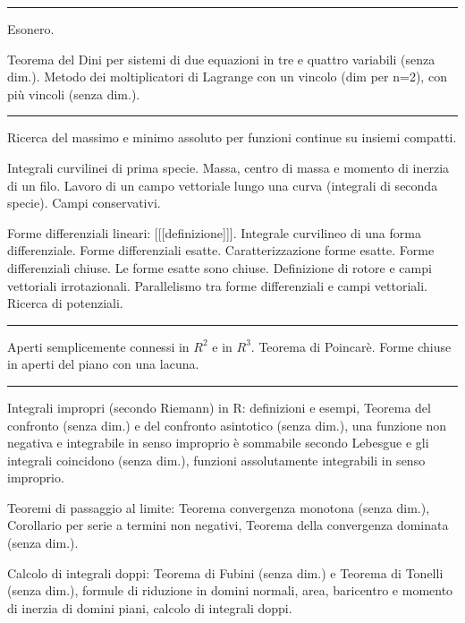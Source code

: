 \documentclass[a4paper,10pt]{article} %
\begin{document}
\begin{multicols}{2}
\bigbreak
\hrule
\bigbreak




Esonero.

Teorema del Dini per sistemi di due equazioni in tre e quattro variabili (senza dim.). Metodo dei moltiplicatori di Lagrange con un vincolo (dim per n=2), con più vincoli (senza dim.).



\bigbreak
\hrule
\bigbreak




Ricerca del massimo e minimo assoluto per funzioni continue su insiemi compatti.

Integrali curvilinei di prima specie. Massa, centro di massa e momento di inerzia di un filo. Lavoro di un campo vettoriale lungo una curva (integrali di seconda specie). Campi conservativi.

Forme differenziali lineari: [[[definizione]]]. Integrale curvilineo di una forma differenziale. Forme differenziali esatte. Caratterizzazione forme esatte. Forme differenziali chiuse. Le forme esatte sono chiuse. Definizione di rotore e campi vettoriali irrotazionali. Parallelismo tra forme differenziali e campi vettoriali. Ricerca di potenziali.





\bigbreak
\hrule
\bigbreak




Aperti semplicemente connessi in $R^2$ e in $R^3$. Teorema di Poincarè. Forme chiuse in aperti del piano con una lacuna.





\bigbreak
\hrule
\bigbreak




Integrali impropri (secondo Riemann) in R: definizioni e esempi, Teorema del confronto (senza dim.) e del confronto asintotico (senza dim.), una funzione non negativa e integrabile in senso improprio è sommabile secondo Lebesgue e gli integrali coincidono (senza dim.), funzioni assolutamente integrabili in senso improprio.

Teoremi di passaggio al limite: Teorema convergenza monotona (senza dim.), Corollario per serie a termini non negativi, Teorema della convergenza dominata (senza dim.).

Calcolo di integrali doppi: Teorema di Fubini (senza dim.) e Teorema di Tonelli (senza dim.), formule di riduzione in domini normali, area, baricentro e momento di inerzia di domini piani, calcolo di integrali doppi.






\end{multicols}
\end{document}

